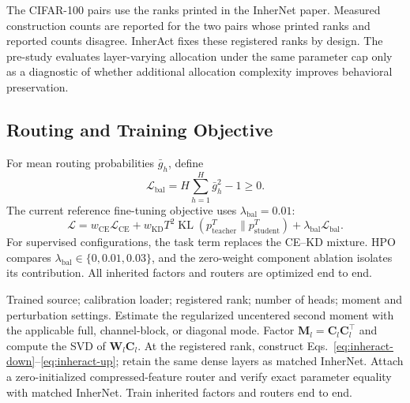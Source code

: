 \documentclass{article}
\newcommand{\bW}{\mathbf{W}}
\newcommand{\bM}{\mathbf{M}}
\newcommand{\bC}{\mathbf{C}}
\begin{document}
The CIFAR-100 pairs use the ranks printed in the InherNet paper.  Measured
construction counts are reported for the two pairs whose printed ranks and
reported counts disagree.  InherAct fixes these registered ranks by design.  The
pre-study evaluates layer-varying allocation under the same parameter cap only as a
diagnostic of whether additional allocation complexity improves behavioral
preservation.

\subsection{Routing and Training Objective}

For mean routing probabilities $\bar g_h$, define
\begin{equation}
  \mathcal{L}_{\mathrm{bal}}
  =H\sum_{h=1}^{H}\bar g_h^2-1\geq0.
  \label{eq:balance}
\end{equation}
The current reference fine-tuning objective uses
$\lambda_{\mathrm{bal}}=0.01$:
\begin{equation}
  \mathcal{L}
  =w_{\mathrm{CE}}\mathcal{L}_{\mathrm{CE}}
   +w_{\mathrm{KD}}T^2
     \operatorname{KL}(p_{\mathrm{teacher}}^T
                        \|p_{\mathrm{student}}^T)
   +\lambda_{\mathrm{bal}}\mathcal{L}_{\mathrm{bal}}.
  \label{eq:training-objective}
\end{equation}
For supervised configurations, the task term replaces the CE--KD mixture.
HPO compares $\lambda_{\mathrm{bal}}\in\{0,0.01,0.03\}$, and the zero-weight
component ablation isolates its contribution.  All inherited factors and
routers are optimized end to end.

\begin{algorithm}[t]
\caption{InherAct registered-rank decomposition}
\label{alg:inheract}
\begin{algorithmic}[1]
\REQUIRE Trained source; calibration loader; registered rank; number of
heads; moment and perturbation settings.
  \STATE Estimate the regularized uncentered second moment with the applicable
         full, channel-block, or diagonal mode.
  \STATE Factor $\bM_l=\bC_l\bC_l^\top$ and compute the SVD of
         $\bW_l\bC_l$.
  \STATE At the registered rank, construct
         Eqs.~\eqref{eq:inheract-down}--\eqref{eq:inheract-up}; retain the same
         dense layers as matched InherNet.
\ENDFOR
\STATE Attach a zero-initialized compressed-feature router and verify exact
       parameter equality with matched InherNet.
\STATE Train inherited factors and routers end to end.
\end{algorithmic}
\end{algorithm}
\end{document}
